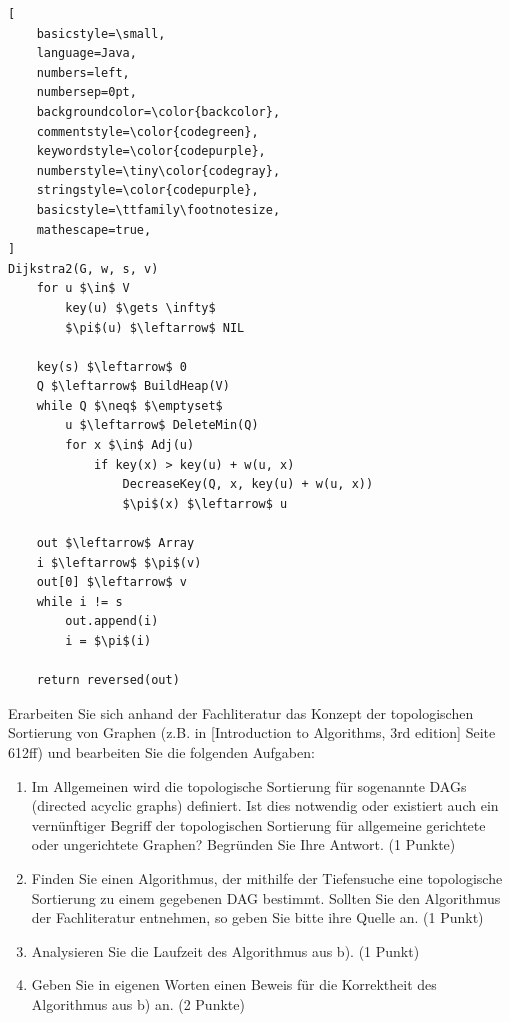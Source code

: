 \documentclass[ngerman,landscape,twocolumn]{adtexsheet}
\begin{document}
 \begin{lstlisting}[
    basicstyle=\small,
    language=Java,
    numbers=left,                    
    numbersep=0pt,
    backgroundcolor=\color{backcolor},   
    commentstyle=\color{codegreen},
    keywordstyle=\color{codepurple},
    numberstyle=\tiny\color{codegray},
    stringstyle=\color{codepurple},
    basicstyle=\ttfamily\footnotesize,
    mathescape=true,
]
Dijkstra2(G, w, s, v)
    for u $\in$ V
        key(u) $\gets \infty$
        $\pi$(u) $\leftarrow$ NIL

    key(s) $\leftarrow$ 0
    Q $\leftarrow$ BuildHeap(V)
    while Q $\neq$ $\emptyset$
        u $\leftarrow$ DeleteMin(Q)
        for x $\in$ Adj(u)
            if key(x) > key(u) + w(u, x)
                DecreaseKey(Q, x, key(u) + w(u, x))
                $\pi$(x) $\leftarrow$ u
    
    out $\leftarrow$ Array
    i $\leftarrow$ $\pi$(v)
    out[0] $\leftarrow$ v
    while i != s
        out.append(i)
        i = $\pi$(i)
        
    return reversed(out)

\end{lstlisting}
\begin{question}
    Erarbeiten Sie sich anhand der Fachliteratur das Konzept der topologischen Sortierung von Graphen (z.B. in [Introduction to Algorithms, 3rd edition] Seite 612ff) und bearbeiten Sie die folgenden Aufgaben: 
    \begin{enumerate}
        \item Im Allgemeinen wird die topologische Sortierung für sogenannte DAGs (directed acyclic graphs) definiert. Ist dies notwendig oder existiert auch ein vernünftiger Begriff der topologischen Sortierung für allgemeine gerichtete oder ungerichtete Graphen? Begründen Sie Ihre Antwort.  (1 Punkte)
        \item Finden Sie einen Algorithmus, der mithilfe der Tiefensuche eine topologische
        Sortierung zu einem gegebenen DAG bestimmt. Sollten Sie den Algorithmus der
        Fachliteratur entnehmen, so geben Sie bitte ihre Quelle an. (1 Punkt)
        \item Analysieren Sie die Laufzeit des Algorithmus aus b). (1 Punkt)
        \item Geben Sie in eigenen Worten einen Beweis für die Korrektheit des Algorithmus aus b) an. (2 Punkte)
    \end{enumerate}
    \end{question}
\end{document}
